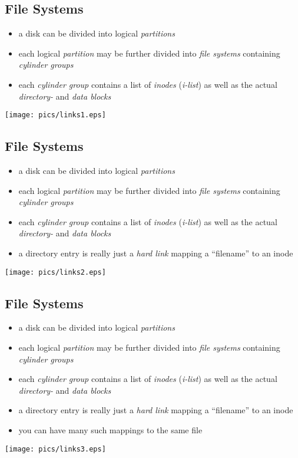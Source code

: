 \documentclass[xga]{xdvislides}
\begin{document}
\subsection{File Systems}
\begin{itemize}
	\item a disk can be divided into logical {\em partitions}
	\item each logical {\em partition} may be further divided into
		{\em file systems} containing {\em cylinder groups}
	\item each {\em cylinder group} contains a list of {\em inodes} ({\em i-list})
		as well as the actual {\em directory-} and {\em data blocks}
\end{itemize}
\texttt{[image: pics/links1.eps]}

\subsection{File Systems}
\begin{itemize}
	\item a disk can be divided into logical {\em partitions}
	\item each logical {\em partition} may be further divided into
		{\em file systems} containing {\em cylinder groups}
	\item each {\em cylinder group} contains a list of {\em inodes} ({\em i-list})
		as well as the actual {\em directory-} and {\em data blocks}
	\item a directory entry is really just a {\em hard link} mapping a
		``filename'' to an inode
\end{itemize}
\texttt{[image: pics/links2.eps]}

\subsection{File Systems}
\begin{itemize}
	\item a disk can be divided into logical {\em partitions}
	\item each logical {\em partition} may be further divided into
		{\em file systems} containing {\em cylinder groups}
	\item each {\em cylinder group} contains a list of {\em inodes} ({\em i-list})
		as well as the actual {\em directory-} and {\em data blocks}
	\item a directory entry is really just a {\em hard link} mapping a
		``filename'' to an inode
	\item you can have many such mappings to the same file
\end{itemize}
\texttt{[image: pics/links3.eps]}
\end{document}
